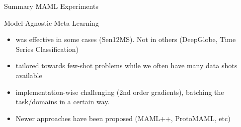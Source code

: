 \documentclass[11pt]{beamer}
\newcommand{\citeapa}[1]{ {\tiny#1\par} }
\begin{document}
	\begin{frame}{Summary MAML Experiments}
		
				Model-Agnostic Meta Learning
				\begin{itemize}
					\item<1-> was effective in some cases (Sen12MS). Not in others (DeepGlobe, Time Series Classification)
					\item<2-> tailored towards few-shot problems while we often have many data shots available 
					\item<3-> implementation-wise challenging (2nd order gradients), batching the task/domains in a certain way.
					\item<4-> Newer approaches have been proposed (MAML++, ProtoMAML, etc)
				\end{itemize}

%		
%	


	\end{frame}
\end{document}

